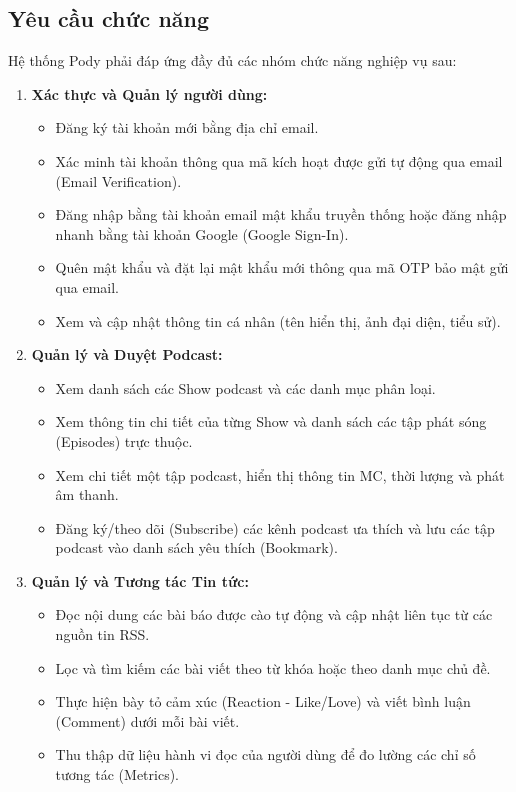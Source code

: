 \documentclass[12pt,a4paper]{report}
\begin{document}
\subsection{Yêu cầu chức năng}
Hệ thống Pody phải đáp ứng đầy đủ các nhóm chức năng nghiệp vụ sau:
\begin{enumerate}
    \item \textbf{Xác thực và Quản lý người dùng:}
    \begin{itemize}
        \item Đăng ký tài khoản mới bằng địa chỉ email.
        \item Xác minh tài khoản thông qua mã kích hoạt được gửi tự động qua email (Email Verification).
        \item Đăng nhập bằng tài khoản email mật khẩu truyền thống hoặc đăng nhập nhanh bằng tài khoản Google (Google Sign-In).
        \item Quên mật khẩu và đặt lại mật khẩu mới thông qua mã OTP bảo mật gửi qua email.
        \item Xem và cập nhật thông tin cá nhân (tên hiển thị, ảnh đại diện, tiểu sử).
    \end{itemize}
    \item \textbf{Quản lý và Duyệt Podcast:}
    \begin{itemize}
        \item Xem danh sách các Show podcast và các danh mục phân loại.
        \item Xem thông tin chi tiết của từng Show và danh sách các tập phát sóng (Episodes) trực thuộc.
        \item Xem chi tiết một tập podcast, hiển thị thông tin MC, thời lượng và phát âm thanh.
        \item Đăng ký/theo dõi (Subscribe) các kênh podcast ưa thích và lưu các tập podcast vào danh sách yêu thích (Bookmark).
    \end{itemize}
    \item \textbf{Quản lý và Tương tác Tin tức:}
    \begin{itemize}
        \item Đọc nội dung các bài báo được cào tự động và cập nhật liên tục từ các nguồn tin RSS.
        \item Lọc và tìm kiếm các bài viết theo từ khóa hoặc theo danh mục chủ đề.
        \item Thực hiện bày tỏ cảm xúc (Reaction - Like/Love) và viết bình luận (Comment) dưới mỗi bài viết.
        \item Thu thập dữ liệu hành vi đọc của người dùng để đo lường các chỉ số tương tác (Metrics).

\end{itemize}
\end{enumerate}
\end{document}
